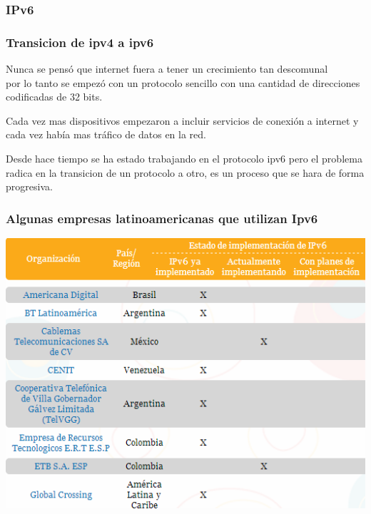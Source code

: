 \documentclass{beamer}
\begin{document}
\begin{frame}
\frametitle{ IPv6}
\end{frame}


\begin{frame}
	\frametitle{Transicion de ipv4 a ipv6}
	Nunca se pensó que internet fuera a tener un crecimiento tan descomunal\\ por lo tanto se empezó con un protocolo sencillo con una cantidad de direcciones codificadas de 32 bits.
	\par Cada vez mas dispositivos empezaron a incluir servicios de conexión a internet y cada vez había mas tráfico de datos en la red. 
	\par Desde hace tiempo se ha estado trabajando en el protocolo ipv6 pero el problema radica en la transicion de un protocolo a otro, es un proceso que se hara de forma progresiva.
\end{frame}


\begin{frame}
\frametitle{Algunas empresas latinoamericanas que utilizan Ipv6}

\includegraphics[height=1\textheight]{empresas ipv6 la.png}

\end{frame}
\end{document}
